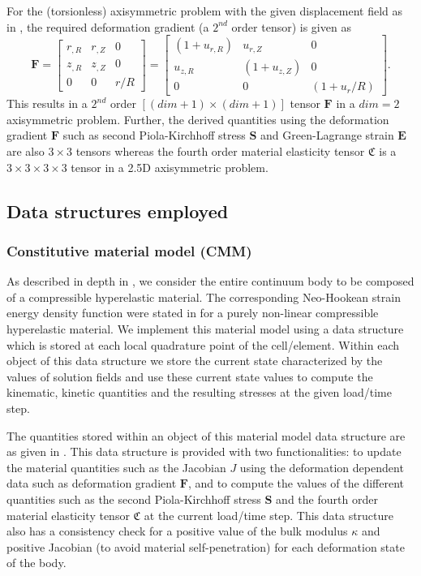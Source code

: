For the (torsionless) axisymmetric problem with the given displacement field as in , the required deformation gradient (a $2^{nd}$ order tensor) is given as \cite{Zienkiewicz2013}
\begin{equation}
\mathbf{F} = \begin{bmatrix}
r_{, R} & r_{, Z} & 0 \\
z_{, R} & z_{, Z} & 0 \\
0 & 0 & r/R
\end{bmatrix} = \begin{bmatrix}
(1 + u_{r, R}) & u_{r, Z} & 0 \\
u_{z, R} & (1 + u_{z, Z}) & 0 \\
0 & 0 & (1 + u_r / R)
\end{bmatrix}.
\label{eq:2.26}
\end{equation}
This results in a $2^{nd}$ order $[(dim + 1) \times (dim + 1)]$ tensor $\mathbf{F}$ in a $dim = 2$ axisymmetric problem.  Further, the derived quantities using the deformation gradient $\mathbf{F}$ such as second Piola-Kirchhoff stress $\mathbf{S}$ and Green-Lagrange strain $\mathbf{E}$ are also $3 \times 3$ tensors whereas the fourth order material elasticity tensor $\mathfrak{C}$ is a $3 \times 3 \times 3 \times 3$ tensor in a 2.5D axisymmetric problem.

\subsection{Data structures employed}
\subsubsection{Constitutive material model (CMM)}
As described in depth in , we consider the entire continuum body to be composed of a compressible hyperelastic material. The corresponding Neo-Hookean strain energy density function were stated in  for a purely non-linear compressible hyperelastic material. We implement this material model using a data structure which is stored at each local quadrature point of the cell/element. Within each object of this data structure we store the current state characterized by the values of solution fields and use these current state values to compute the kinematic, kinetic quantities and the resulting stresses at the given load/time step.\par 
The quantities stored within an object of this material model data structure are as given in . This data structure is provided with two functionalities: to update the material quantities such as the Jacobian $J$ using the deformation dependent data such as deformation gradient $\mathbf{F}$, and to compute the values of the different quantities such as the second Piola-Kirchhoff stress $\mathbf{S}$ and the fourth order material elasticity tensor $\mathfrak{C}$ at the current load/time step. This data structure also has a consistency check for a positive value of the bulk modulus $\kappa$ and positive Jacobian (to avoid material self-penetration) for each deformation state of the body. \par 

